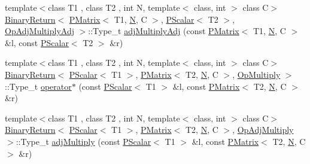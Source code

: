 \begin{DoxyCompactItemize}
{\footnotesize template$<$class T1 , class T2 , int N, template$<$ class, int $>$ class C$>$ }\\\mbox{\hyperlink{structENSEM_1_1BinaryReturn}{Binary\+Return}}$<$ \mbox{\hyperlink{classENSEM_1_1PMatrix}{P\+Matrix}}$<$ T1, \mbox{\hyperlink{operator__name__util_8cc_a7722c8ecbb62d99aee7ce68b1752f337}{N}}, C $>$, \mbox{\hyperlink{classENSEM_1_1PScalar}{P\+Scalar}}$<$ T2 $>$, \mbox{\hyperlink{structENSEM_1_1OpAdjMultiplyAdj}{Op\+Adj\+Multiply\+Adj}} $>$\+::Type\+\_\+t \mbox{\hyperlink{group__primmatrix_gada4da32758440b83d445ae4a0e14297e}{adj\+Multiply\+Adj}} (const \mbox{\hyperlink{classENSEM_1_1PMatrix}{P\+Matrix}}$<$ T1, \mbox{\hyperlink{operator__name__util_8cc_a7722c8ecbb62d99aee7ce68b1752f337}{N}}, C $>$ \&l, const \mbox{\hyperlink{classENSEM_1_1PScalar}{P\+Scalar}}$<$ T2 $>$ \&r)
\item 
{\footnotesize template$<$class T1 , class T2 , int N, template$<$ class, int $>$ class C$>$ }\\\mbox{\hyperlink{structENSEM_1_1BinaryReturn}{Binary\+Return}}$<$ \mbox{\hyperlink{classENSEM_1_1PScalar}{P\+Scalar}}$<$ T1 $>$, \mbox{\hyperlink{classENSEM_1_1PMatrix}{P\+Matrix}}$<$ T2, \mbox{\hyperlink{operator__name__util_8cc_a7722c8ecbb62d99aee7ce68b1752f337}{N}}, C $>$, \mbox{\hyperlink{structENSEM_1_1OpMultiply}{Op\+Multiply}} $>$\+::Type\+\_\+t \mbox{\hyperlink{group__primmatrix_ga2f9521924540b40d00ad4aa1606bfb22}{operator$\ast$}} (const \mbox{\hyperlink{classENSEM_1_1PScalar}{P\+Scalar}}$<$ T1 $>$ \&l, const \mbox{\hyperlink{classENSEM_1_1PMatrix}{P\+Matrix}}$<$ T2, \mbox{\hyperlink{operator__name__util_8cc_a7722c8ecbb62d99aee7ce68b1752f337}{N}}, C $>$ \&r)
\item 
{\footnotesize template$<$class T1 , class T2 , int N, template$<$ class, int $>$ class C$>$ }\\\mbox{\hyperlink{structENSEM_1_1BinaryReturn}{Binary\+Return}}$<$ \mbox{\hyperlink{classENSEM_1_1PScalar}{P\+Scalar}}$<$ T1 $>$, \mbox{\hyperlink{classENSEM_1_1PMatrix}{P\+Matrix}}$<$ T2, \mbox{\hyperlink{operator__name__util_8cc_a7722c8ecbb62d99aee7ce68b1752f337}{N}}, C $>$, \mbox{\hyperlink{structENSEM_1_1OpAdjMultiply}{Op\+Adj\+Multiply}} $>$\+::Type\+\_\+t \mbox{\hyperlink{group__primmatrix_ga01de3db0f09195f592339c9241bd4692}{adj\+Multiply}} (const \mbox{\hyperlink{classENSEM_1_1PScalar}{P\+Scalar}}$<$ T1 $>$ \&l, const \mbox{\hyperlink{classENSEM_1_1PMatrix}{P\+Matrix}}$<$ T2, \mbox{\hyperlink{operator__name__util_8cc_a7722c8ecbb62d99aee7ce68b1752f337}{N}}, C $>$ \&r)
\item 

\end{DoxyCompactItemize}
